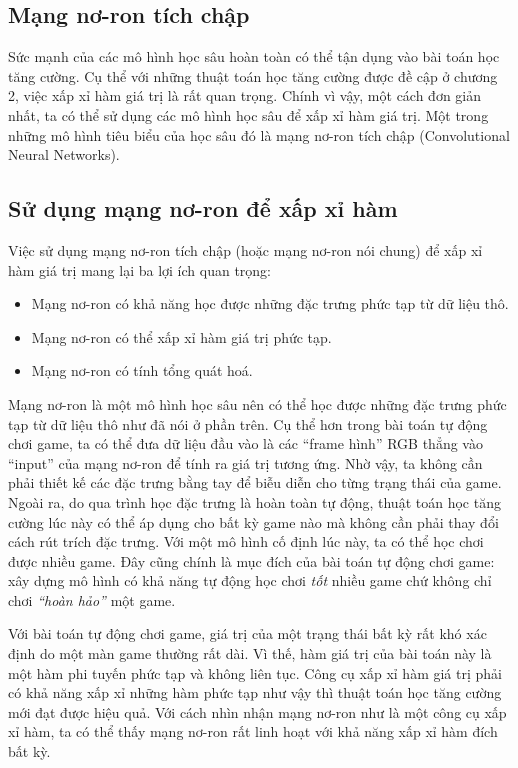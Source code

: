 \subsection{Mạng nơ-ron tích chập}
	Sức mạnh của các mô hình học sâu hoàn toàn có thể tận dụng vào bài toán học tăng cường.
	Cụ thể với những thuật toán học tăng cường được đề cập ở chương 2, việc xấp xỉ hàm giá trị là rất quan trọng.
	Chính vì vậy, một cách đơn giản nhất, ta có thể sử dụng các mô hình học sâu để xấp xỉ hàm giá trị.
	Một trong những mô hình tiêu biểu của học sâu đó là mạng nơ-ron tích chập (Convolutional Neural Networks).
	

\subsection{Sử dụng mạng nơ-ron để xấp xỉ hàm}
	Việc sử dụng mạng nơ-ron tích chập (hoặc mạng nơ-ron nói chung) để xấp xỉ hàm giá trị mang lại ba lợi ích quan trọng:
	\begin{itemize}
		\item Mạng nơ-ron có khả năng học được những đặc trưng phức tạp từ dữ liệu thô.
		\item Mạng nơ-ron có thể xấp xỉ hàm giá trị phức tạp.
		\item Mạng nơ-ron có tính tổng quát hoá.
	\end{itemize}
	
	Mạng nơ-ron là một mô hình học sâu nên có thể học được những đặc trưng phức tạp từ dữ liệu thô như đã nói ở phần trên.
	Cụ thể hơn trong bài toán tự động chơi game, ta có thể đưa dữ liệu đầu vào là các ``frame hình'' RGB thẳng vào ``input'' của mạng nơ-ron để tính ra giá trị tương ứng.
	Nhờ vậy, ta không cần phải thiết kế các đặc trưng bằng tay để biễu diễn cho từng trạng thái của game.
	Ngoài ra, do qua trình học đặc trưng là hoàn toàn tự động, thuật toán học tăng cường lúc này có thể áp dụng cho bất kỳ game nào mà không cần phải thay đổi cách rút trích đặc trưng.
	Với một mô hình cố định lúc này, ta có thể học chơi được nhiều game.
	Đây cũng chính là mục đích của bài toán tự động chơi game: xây dựng mô hình có khả năng tự động học chơi \textit{tốt} nhiều game chứ không chỉ chơi \textit{``hoàn hảo''} một game.
	
	Với bài toán tự động chơi game, giá trị của một trạng thái bất kỳ rất khó xác định do một màn game thường rất dài.
	Vì thế, hàm giá trị của bài toán này là một hàm phi tuyến phức tạp và không liên tục.
	Công cụ xấp xỉ hàm giá trị phải có khả năng xấp xỉ những hàm phức tạp như vậy thì thuật toán học tăng cường mới đạt được hiệu quả.
	Với cách nhìn nhận mạng nơ-ron như là một công cụ xấp xỉ hàm, ta có thể thấy mạng nơ-ron rất linh hoạt với khả năng xấp xỉ hàm đích bất kỳ.
	
